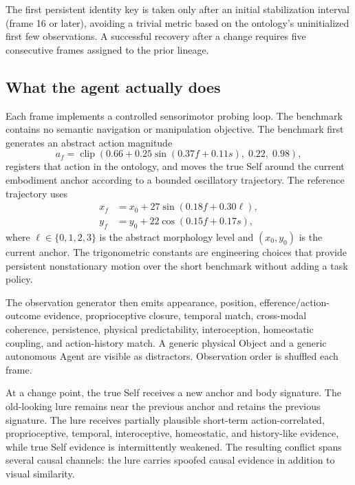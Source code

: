 \documentclass[10pt,journal,onecolumn]{IEEEtran}
\begin{document}
The first persistent identity key is taken only after an initial stabilization interval (frame 16 or later), avoiding a trivial metric based on the ontology's uninitialized first few observations. A successful recovery after a change requires five consecutive frames assigned to the prior lineage.

\subsection{What the agent actually does}
Each frame implements a controlled sensorimotor probing loop. The benchmark contains no semantic navigation or manipulation objective. The benchmark first generates an abstract action magnitude
\begin{equation}
a_f=\operatorname{clip}\!\left(0.66+0.25\sin(0.37f+0.11s),\;0.22,\;0.98\right),
\label{eq:action}
\end{equation}
registers that action in the ontology, and moves the true Self around the current embodiment anchor according to a bounded oscillatory trajectory. The reference trajectory uses
\begin{align}
x_f&=x_0+27\sin(0.18f+0.30\ell),\\
y_f&=y_0+22\cos(0.15f+0.17s),
\label{eq:traj}
\end{align}
where $\ell\in\{0,1,2,3\}$ is the abstract morphology level and $(x_0,y_0)$ is the current anchor. The trigonometric constants are engineering choices that provide persistent nonstationary motion over the short benchmark without adding a task policy.

The observation generator then emits appearance, position, efference/action-outcome evidence, proprioceptive closure, temporal match, cross-modal coherence, persistence, physical predictability, interoception, homeostatic coupling, and action-history match. A generic physical Object and a generic autonomous Agent are visible as distractors. Observation order is shuffled each frame.

At a change point, the true Self receives a new anchor and body signature. The old-looking lure remains near the previous anchor and retains the previous signature. The lure receives partially plausible short-term action-correlated, proprioceptive, temporal, interoceptive, homeostatic, and history-like evidence, while true Self evidence is intermittently weakened. The resulting conflict spans several causal channels: the lure carries spoofed causal evidence in addition to visual similarity.
\end{document}
